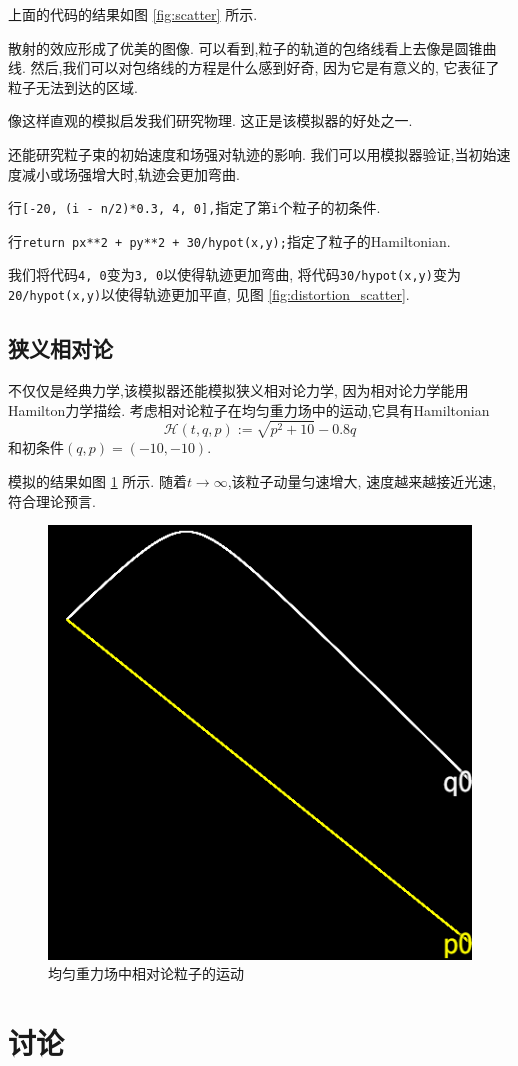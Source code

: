 \documentclass[12pt]{article}
\begin{document}
上面的代码的结果如图 \ref{fig:scatter} 所示.

散射的效应形成了优美的图像.
可以看到,粒子的轨道的包络线看上去像是圆锥曲线.
然后,我们可以对包络线的方程是什么感到好奇,
因为它是有意义的,
它表征了粒子无法到达的区域.

像这样直观的模拟启发我们研究物理.
这正是该模拟器的好处之一.

还能研究粒子束的初始速度和场强对轨迹的影响.
我们可以用模拟器验证,当初始速度减小或场强增大时,轨迹会更加弯曲.

行\texttt{[-20, (i - n/2)*0.3, 4, 0],}指定了第\texttt{i}个粒子的初条件.

行\texttt{return px**2 + py**2 + 30/hypot(x,y);}指定了粒子的Hamiltonian.

我们将代码\texttt{4, 0}变为\texttt{3, 0}以使得轨迹更加弯曲,
将代码\texttt{30/hypot(x,y)}变为\texttt{20/hypot(x,y)}以使得轨迹更加平直,
见图 \ref{fig:distortion_scatter}.

\subsection{狭义相对论}

不仅仅是经典力学,该模拟器还能模拟狭义相对论力学,
因为相对论力学能用Hamilton力学描绘.
考虑相对论粒子在均匀重力场中的运动,它具有Hamiltonian\cite[p. 28]{landau2010fields}
\begin{equation*}
  \mathcal H\left(t,q,p\right):=\sqrt{p^2+10}-0.8q
\end{equation*}
和初条件$\left(q,p\right)=\left(-10,-10\right)$.

模拟的结果如图 \ref{fig:relativity} 所示.
随着$t\rightarrow\infty$,该粒子动量匀速增大,
速度越来越接近光速,
符合理论预言\cite[p. 24]{landau2010fields}.

\begin{figure}[h]
  \centering
  \includegraphics[width=0.25\linewidth]{relativity_gravity.png}
  \caption{均匀重力场中相对论粒子的运动}
  \label{fig:relativity}
\end{figure}

\section{讨论}
\end{document}
